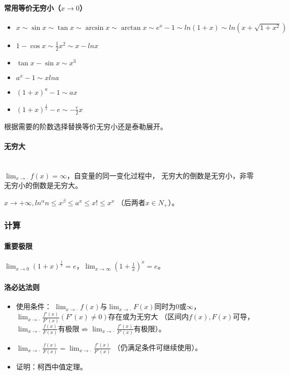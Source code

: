 \documentclass[
12pt, %
a4paper, 
oneside, %
headinclude,footinclude, %
]{scrartcl}
\begin{document}
\paragraph{常用等价无穷小（$ x \rightarrow 0 $）}
\begin{itemize}
\item $ x \sim \sin x \sim \tan x \sim \arcsin x \sim \arctan x \sim e^x -1 \sim ln(1 + x) \sim ln(x + \sqrt{1 + x^2}) $
\item $ 1 - \cos x \sim \frac{1}{2}x^2 \sim x - lnx $
\item $ \tan x - \sin x \sim x^3 $
\item $ a^x -1 \sim x ln a $
\item $ (1 + x)^a - 1 \sim ax $
\item $ (1 + x)^{\frac{1}{x}} - e \sim -\frac{e}{2}x $
\end{itemize}

根据需要的阶数选择替换等价无穷小还是泰勒展开。
\paragraph{无穷大}~\\

$ \lim_{x \to \cdot} f(x) = \infty $，自变量的同一变化过程中，
无穷大的倒数是无穷小，非零无穷小的倒数是无穷大。

$ x \rightarrow + \infty, ln^\alpha n \leq x^\beta \leq a^x \leq x! \leq x^x $
（后两者$ x \in N_+ $）。
\subsubsection[计算]{计算}
\paragraph{重要极限}
$ \lim_{x \to 0} (1 + x)^{\frac{1}{x}} = e $，$ \lim_{x \to \infty} (1 + \frac{1}{x})^{x} = e $。
\paragraph{洛必达法则}
\begin{itemize}
\item 使用条件：
$ \lim_{x \to \cdot} f(x) $与$ \lim_{x \to \cdot} F(x) $同时为$ 0 $或$ \infty $，
$ \lim_{x \to \cdot} \frac{f'(x)}{F'(x)}(F'(x) \neq 0) $存在或为无穷大
（区间内$ f(x), F(x) $可导，$ \lim_{x \to \cdot} \frac{f(x)}{F(x)} $有极限$ \nRightarrow $$ \lim_{x \to \cdot} \frac{f'(x)}{F'(x)} $有极限）。
\item $ \lim_{x \to \cdot} \frac{f(x)}{F(x)} = \lim_{x \to \cdot} \frac{f'(x)}{F'(x)} $
（仍满足条件可继续使用）。
\item 证明：柯西中值定理。
\end{itemize}
\end{document}
